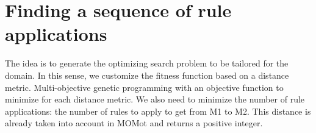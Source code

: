 %
%
%
%


\section{Finding a sequence of rule applications}


The idea is to generate the optimizing search problem to be tailored for the domain. In this sense, we customize the fitness function based on a distance metric. 
Multi-objective genetic programming with an objective function to minimize for each distance metric.
We also need to minimize the number of rule applications: the number of rules to apply to get from M1 to M2. This distance is already taken into account in MOMot and returns a positive integer.